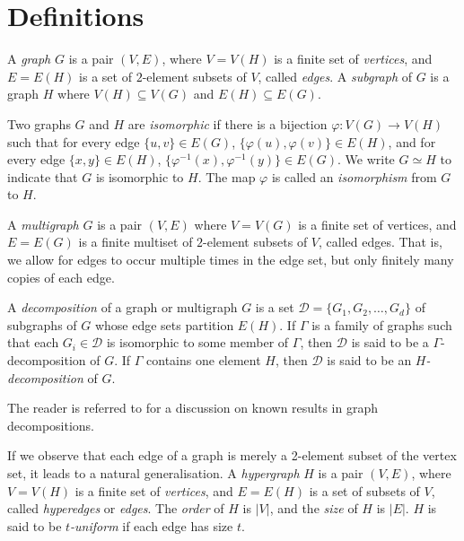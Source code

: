 \section{Definitions}

A {\em graph} $G$ is a pair $(V, E)$, where $V = V(H)$ is a finite set of {\em vertices}, and $E = E(H)$ is a set of $2$-element subsets of $V$, called {\em edges}.
A {\em subgraph} of $G$ is a graph $H$ where $V(H) \subseteq V(G)$ and $E(H) \subseteq E(G)$.

Two graphs $G$ and $H$ are {\em isomorphic} if there is a bijection $\varphi : V(G) \to V(H)$ such that for every edge $\{u, v\} \in E(G)$, $\{\varphi(u), \varphi(v)\} \in E(H)$, and for every edge $\{x, y\} \in E(H)$, $\{\varphi^{-1}(x), \varphi^{-1}(y)\} \in E(G)$.
We write $G \simeq H$ to indicate that $G$ is isomorphic to $H$.
The map $\varphi$ is called an {\em isomorphism} from $G$ to $H$.


A {\em multigraph} $G$ is a pair $(V, E)$ where $V = V(G)$ is a finite set of vertices, and $E = E(G)$ is a finite multiset of $2$-element subsets of $V$, called edges. That is, we allow for edges to occur multiple times in the
edge set, but only finitely many copies of each edge.

A {\em decomposition} of a graph or multigraph $G$ is a set $\mathcal{D} = \{G_1, G_2, \ldots, G_d\}$ of
subgraphs of $G$ whose edge sets partition $E(H)$.
If $\Gamma$ is a family of graphs such that each $G_i \in \mathcal{D}$ is isomorphic to some
member of $\Gamma$, then $\mathcal{D}$ is said to be a $\Gamma$-decomposition of $G$.
If $\Gamma$ contains one element $H$, then $\mathcal{D}$ is said to be an
{\em $H$-decomposition} of $G$.

The reader is referred to \cite{bryant-graph} for a discussion on known results
in graph decompositions.

If we observe that each edge of a graph is merely a 2-element subset of the
vertex set, it leads to a natural generalisation.
A {\em hypergraph} $H$ is a pair $(V, E)$, where $V = V(H)$ is a finite set of
{\em vertices}, and $E = E(H)$ is a set of subsets of $V$, called {\em
hyperedges} or {\em edges}.
The {\em order} of $H$ is $|V|$, and the {\em size} of $H$ is $|E|$.
$H$ is said to be {\em $t$-uniform} if each edge has size $t$.

